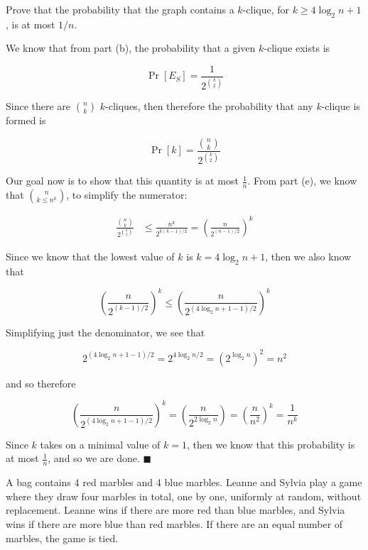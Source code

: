 \documentclass[11pt]{article}
\begin{document}
\begin{Parts}
\Part Prove that the probability that the graph contains a $k$-clique, for $k \geq 4{\log_2 n}+1$, is at most $1/n$.


\begin{solution}
    We know that from part (b), the probability that a given $k$-clique exists is 

    \[ \Pr[E_S] = \frac{1}{2^{k \choose 2}}\] 

    Since there are $n \choose k$ $k$-cliques, then therefore the probability that any $k$-clique is formed is 

    \[ \Pr[k] = \frac{{n \choose k}}{2^{k \choose 2}}\]

    Our goal now is to show that this quantity is at most $\frac{1}{n}$. From part (e), we know that $n \choose k \le n^k$, to simplify the numerator: 

    \begin{align*}
        \frac{{n \choose k}}{2^{k \choose 2}}& \le \frac{n^k}{2^{k (k-1)/2}} = \left(\frac{n}{2^{(n-1)/2}}\right)^k
    \end{align*}

    Since we know that the lowest value of $k$ is $k = 4 \log_2n + 1$, then we also know that 

    \[ \left(\frac{n}{2^{(k-1)/2}}\right)^k \le \left(\frac{n}{2^{(4 \log_2 n+1-1)/2}}\right)^k\]

    Simplifying just the denominator, we see that 

    \[ 2^{(4 \log_2n +1 -1)/2} = 2^{4 \log_2n/2} = (2^{\log_2 n})^2 = n^2\]

    and so therefore 

    \[ \left(\frac{n}{2^{(4 \log_2 n+1-1)/2}}\right)^k = \left(\frac{n}{2^{2\log_2n}}\right) = \left(\frac{n}{n^2}\right)^k = \frac{1}{n^k}\]

    Since $k$ takes on a minimal value of $k = 1$, then we know that this probability is at most $\frac{1}{n}$, and so we are done. $\blacksquare$

\end{solution}
\end{Parts}
\pagebreak
{}
A bag contains 4 red marbles and 4 blue marbles. Leanne and Sylvia play a game where they draw four marbles in total, one by one, uniformly at random, without replacement. Leanne wins if there are more red than blue marbles, and Sylvia wins if there are more blue than red marbles. If there are an equal number of marbles, the game is tied.
\end{document}

